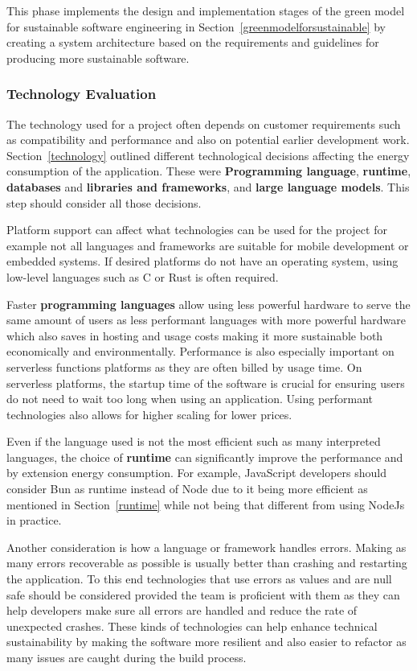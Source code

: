This phase implements the design and implementation stages of the green model for sustainable software engineering in Section~\ref{greenmodelforsustainable} by creating a system architecture based on the requirements and guidelines for producing more sustainable software.

\subsubsection{Technology Evaluation}
The technology used for a project often depends on customer requirements such as compatibility and performance and also on potential earlier development work. Section~\ref{technology} outlined different technological decisions affecting the energy consumption of the application. These were \textbf{Programming language}, \textbf{runtime}, \textbf{databases} and \textbf{libraries and frameworks}, and \textbf{large language models}. This step should consider all those decisions.

Platform support can affect what technologies can be used for the project for example not all languages and frameworks are suitable for mobile development or embedded systems. If desired platforms do not have an operating system, using low-level languages such as C or Rust is often required.

Faster \textbf{programming languages} allow using less powerful hardware to serve the same amount of users as less performant languages with more powerful hardware which also saves in hosting and usage costs making it more sustainable both economically and environmentally. Performance is also especially important on serverless functions platforms as they are often billed by usage time. On serverless platforms, the startup time of the software is crucial for ensuring users do not need to wait too long when using an application. Using performant technologies also allows for higher scaling for lower prices.

Even if the language used is not the most efficient such as many interpreted languages, the choice of \textbf{runtime} can significantly improve the performance and by extension energy consumption. For example, JavaScript developers should consider Bun as runtime instead of Node due to it being more efficient as mentioned in Section~\ref{runtime} while not being that different from using NodeJs in practice.

Another consideration is how a language or framework handles errors. Making as many errors recoverable as possible is usually better than crashing and restarting the application. To this end technologies that use errors as values and are null safe should be considered provided the team is proficient with them as they can help developers make sure all errors are handled and reduce the rate of unexpected crashes. These kinds of technologies can help enhance technical sustainability by making the software more resilient and also easier to refactor as many issues are caught during the build process.


